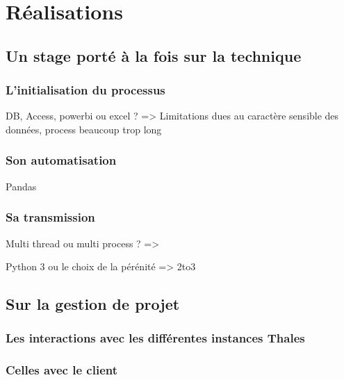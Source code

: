 \chapter{Réalisations}




\section{Un stage porté à la fois sur la technique}

\subsection{L'initialisation du processus}

DB, Access, powerbi ou excel ?
=> Limitations dues au caractère sensible des données, process beaucoup trop long

\subsection{Son automatisation}
Pandas

\subsection{Sa transmission}
Multi thread ou multi process ?
=> 

Python 3 ou le choix de la pérénité
=> 2to3

\section{Sur la gestion de projet}

\subsection{Les interactions avec les différentes instances Thales}

\subsection{Celles avec le client}